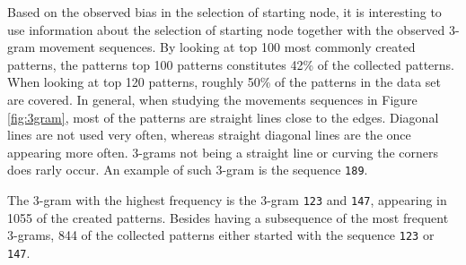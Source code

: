     Based on the observed bias in the selection of starting node, it is interesting to use information about the selection of starting node together with the observed 3-gram movement sequences. By looking at top 100 most commonly created patterns, the patterns top 100 patterns constitutes 42\% of the collected patterns. When looking at top 120 patterns, roughly 50\% of the patterns in the data set are covered. In general, when studying the movements sequences in Figure \ref{fig:3gram}, most of the patterns are straight lines close to the edges. Diagonal lines are not used very often, whereas straight diagonal lines are the once appearing more often. 3-grams not being a straight line or curving the corners does rarly occur. An example of such 3-gram is the sequence \texttt{189}.

    The 3-gram with the highest frequency is the 3-gram \texttt{123} and \texttt{147}, appearing in 1055 of the created patterns. Besides having a subsequence of the most frequent 3-grams,  844 of the collected patterns either started with the sequence \texttt{123} or \texttt{147}.

    


